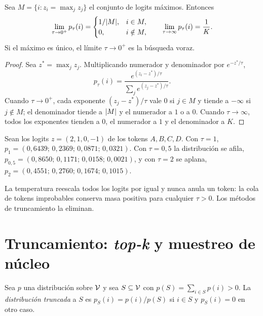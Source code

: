 \begin{proposicion}\label{prop:limites-tau}
Sea $M=\{i:z_i=\max_j z_j\}$ el conjunto de logits máximos. Entonces
\[
\lim_{\tau\to 0^{+}}p_\tau(i)=\begin{cases}1/\lvert M\rvert, & i\in M,\\ 0,& i\notin M,\end{cases}
\qquad
\lim_{\tau\to\infty}p_\tau(i)=\frac{1}{K}.
\]
Si el máximo es único, el límite $\tau\to 0^{+}$ es la búsqueda voraz.
\end{proposicion}

\begin{proof}
Sea $z^{\ast}=\max_j z_j$. Multiplicando numerador y denominador por $e^{-z^{\ast}/\tau}$,
\[
p_\tau(i)=\frac{e^{(z_i-z^{\ast})/\tau}}{\sum_{j}e^{(z_j-z^{\ast})/\tau}}.
\]
Cuando $\tau\to 0^{+}$, cada exponente $(z_j-z^{\ast})/\tau$ vale $0$ si $j\in M$ y tiende a $-\infty$ si $j\notin M$; el denominador tiende a $\lvert M\rvert$ y el numerador a $1$ o a $0$. Cuando $\tau\to\infty$, todos los exponentes tienden a $0$, el numerador a $1$ y el denominador a $K$.
\end{proof}

\begin{ejemplo}\label{ej:muestreo}
Sean los logits $z=(2,1,0,-1)$ de los tokens $A,B,C,D$. Con $\tau=1$, $p_1=(0{,}6439;\allowbreak\,0{,}2369;\allowbreak\,0{,}0871;\allowbreak\,0{,}0321)$. Con $\tau=0{,}5$ la distribución se afila, $p_{0{,}5}=(0{,}8650;\allowbreak\,0{,}1171;\allowbreak\,0{,}0158;\allowbreak\,0{,}0021)$, y con $\tau=2$ se aplana, $p_{2}=(0{,}4551;\allowbreak\,0{,}2760;\allowbreak\,0{,}1674;\allowbreak\,0{,}1015)$.
\end{ejemplo}

La temperatura reescala todos los logits por igual y nunca anula un token: la cola de tokens improbables conserva masa positiva para cualquier $\tau>0$. Los métodos de truncamiento la eliminan.

\section{Truncamiento: \emph{top-k} y muestreo de núcleo}

\begin{definicion}\label{def:truncada}
Sea $p$ una distribución sobre $\mathcal{V}$ y sea $S\subseteq\mathcal{V}$ con $p(S)=\sum_{i\in S}p(i)>0$. La \emph{distribución truncada} a $S$ es $p_S(i)=p(i)/p(S)$ si $i\in S$ y $p_S(i)=0$ en otro caso.
\end{definicion}


